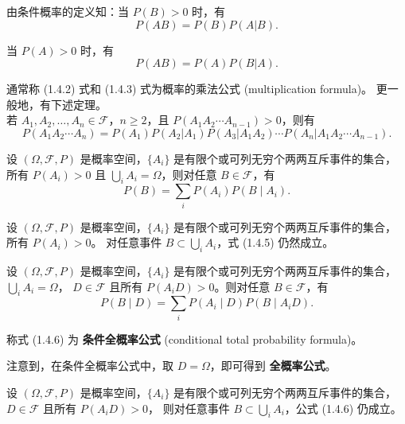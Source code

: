 \begin{theorem}[同时发生概率和条件概率的关系]
由条件概率的定义知：当 $P(B) > 0$ 时，有
\begin{equation}
P(AB) = P(B) P(A|B). \tag{1.4.2}
\end{equation}

当 $P(A) > 0$ 时，有
\begin{equation}
P(AB) = P(A) P(B|A). \tag{1.4.3}
\end{equation}

通常称 (1.4.2) 式和 (1.4.3) 式为概率的乘法公式 (multiplication formula)。
更一般地，有下述定理。
\\若 $A_1, A_2, \dots, A_n \in \mathcal{F}$，$n \geq 2$，且 $P(A_1 A_2 \cdots A_{n-1}) > 0$，则有
\begin{equation}
P(A_1 A_2 \cdots A_n) = P(A_1) P(A_2|A_1) P(A_3|A_1 A_2) \cdots P(A_n|A_1 A_2 \cdots A_{n-1}). \tag{1.4.4}
\end{equation}
\end{theorem}
\begin{theorem}[全概率公式]
设 $(\Omega, \mathcal{F}, P)$ 是概率空间，$\{A_i\}$ 是有限个或可列无穷个两两互斥事件的集合，
所有 $P(A_i) > 0$ 且 $\bigcup_i A_i = \Omega$，则对任意 $B \in \mathcal{F}$，有
\begin{equation}
P(B) = \sum_i P(A_i) P(B \mid A_i). \tag{1.4.5}
\end{equation}
\end{theorem}
\begin{corollary}[1.4.1]
设 $(\Omega, \mathcal{F}, P)$ 是概率空间，$\{A_i\}$ 是有限个或可列无穷个两两互斥事件的集合，所有 $P(A_i) > 0$。  
对任意事件 $B \subset \bigcup_i A_i$，式 (1.4.5) 仍然成立。
\end{corollary}

\begin{theorem}[条件全概率公式]
设 $(\Omega, \mathcal{F}, P)$ 是概率空间，$\{A_i\}$ 是有限个或可列无穷个两两互斥事件的集合，$\bigcup_i A_i = \Omega$，  
$D \in \mathcal{F}$ 且所有 $P(A_i D) > 0$。则对任意 $B \in \mathcal{F}$，有
\begin{equation}
P(B \mid D) = \sum_i P(A_i \mid D) P(B \mid A_i D). \tag{1.4.6}
\end{equation}
\end{theorem}
称式 (1.4.6) 为 \textbf{条件全概率公式} (conditional total probability formula)。  

注意到，在条件全概率公式中，取 $D = \Omega$，即可得到 \textbf{全概率公式}。
\begin{corollary}[1.4.2]
设 $(\Omega, \mathscr{F}, P)$ 是概率空间，$\{A_i\}$ 是有限个或可列无穷个两两互斥事件的集合，$D \in \mathscr{F}$ 且所有 $P(A_i D) > 0$，  
则对任意事件 $B \subset \bigcup_i A_i$，公式 (1.4.6) 仍成立。
\end{corollary}
